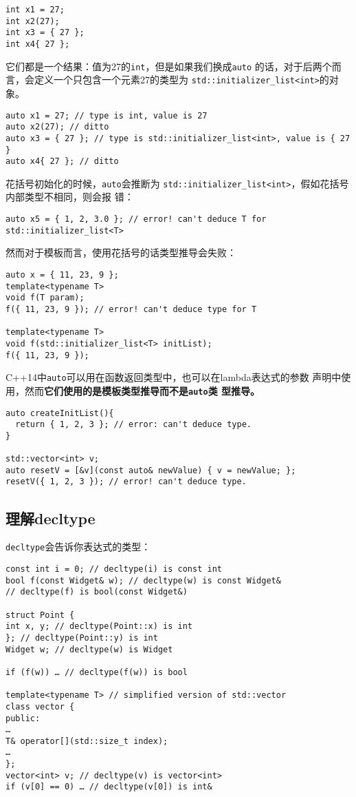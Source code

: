 \begin{verbatim}
int x1 = 27;
int x2(27);
int x3 = { 27 };
int x4{ 27 };
\end{verbatim}
它们都是一个结果：值为27的\texttt{int}，但是如果我们换成\texttt{auto}
的话，对于后两个而言，会定义一个只包含一个元素27的类型为
\texttt{std::initializer\_list<int>}的对象。
\begin{verbatim}
auto x1 = 27; // type is int, value is 27
auto x2(27); // ditto
auto x3 = { 27 }; // type is std::initializer_list<int>, value is { 27 }
auto x4{ 27 }; // ditto
\end{verbatim}

花括号初始化的时候，\texttt{auto}会推断为
\texttt{std::initializer\_list<int>}，假如花括号内部类型不相同，则会报
错：
\begin{verbatim}
auto x5 = { 1, 2, 3.0 }; // error! can't deduce T for std::initializer_list<T>
\end{verbatim}

然而对于模板而言，使用花括号的话类型推导会失败：
\begin{verbatim}
auto x = { 11, 23, 9 };
template<typename T> 
void f(T param);
f({ 11, 23, 9 }); // error! can't deduce type for T

template<typename T>
void f(std::initializer_list<T> initList);
f({ 11, 23, 9 });
\end{verbatim}

C++14中\texttt{auto}可以用在函数返回类型中，也可以在lambda表达式的参数
声明中使用，然而\textbf{它们使用的是模板类型推导而不是\texttt{auto}类
  型推导。}

\begin{verbatim}
auto createInitList(){
  return { 1, 2, 3 }; // error: can't deduce type.
}

std::vector<int> v;
auto resetV = [&v](const auto& newValue) { v = newValue; }; 
resetV({ 1, 2, 3 }); // error! can't deduce type.
\end{verbatim}


\subsection{理解decltype}
\label{sec:Item2-3}

\texttt{decltype}会告诉你表达式的类型：
\begin{verbatim}
const int i = 0; // decltype(i) is const int
bool f(const Widget& w); // decltype(w) is const Widget&
// decltype(f) is bool(const Widget&)

struct Point {
int x, y; // decltype(Point::x) is int
}; // decltype(Point::y) is int
Widget w; // decltype(w) is Widget

if (f(w)) … // decltype(f(w)) is bool

template<typename T> // simplified version of std::vector
class vector {
public:
…
T& operator[](std::size_t index);
…
};
vector<int> v; // decltype(v) is vector<int>
if (v[0] == 0) … // decltype(v[0]) is int&
\end{verbatim}

